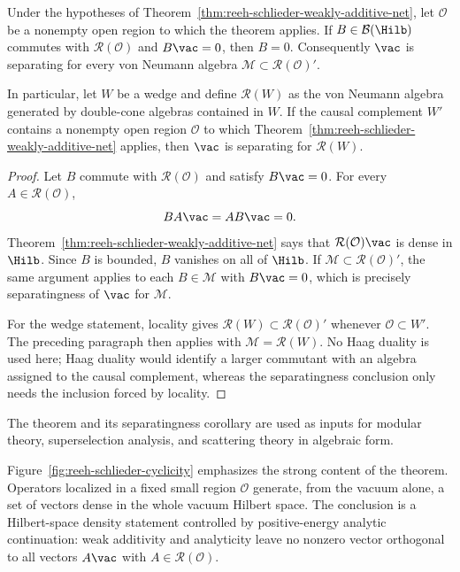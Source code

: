 \begin{corollary}
\label{cor:reeh-schlieder-separatingness}
Under the hypotheses of
Theorem~\ref{thm:reeh-schlieder-weakly-additive-net}, let
\(\mathcal O\) be a nonempty open region to which the theorem applies.
If \(B\in\mathcal B(\Hilb)\) commutes with \(\mathcal R(\mathcal O)\) and
\(B\vac=0\), then \(B=0\).  Consequently \(\vac\) is separating for every
von Neumann algebra \(\mathcal M\subset\mathcal R(\mathcal O)'\).

In particular, let \(W\) be a wedge and define \(\mathcal R(W)\) as the von
Neumann algebra generated by double-cone algebras contained in \(W\).  If the
causal complement \(W'\) contains a nonempty open region \(\mathcal O\) to
which Theorem~\ref{thm:reeh-schlieder-weakly-additive-net} applies, then
\(\vac\) is separating for \(\mathcal R(W)\).
\end{corollary}

\begin{proof}
Let \(B\) commute with \(\mathcal R(\mathcal O)\) and satisfy \(B\vac=0\).
For every \(A\in\mathcal R(\mathcal O)\),
\[
  B A\vac=A B\vac=0 .
\]
Theorem~\ref{thm:reeh-schlieder-weakly-additive-net} says that
\(\mathcal R(\mathcal O)\vac\) is dense in \(\Hilb\).  Since \(B\) is
bounded, \(B\) vanishes on all of \(\Hilb\).  If
\(\mathcal M\subset\mathcal R(\mathcal O)'\), the same argument applies to
each \(B\in\mathcal M\) with \(B\vac=0\), which is precisely separatingness
of \(\vac\) for \(\mathcal M\).

For the wedge statement, locality gives
\(\mathcal R(W)\subset\mathcal R(\mathcal O)'\) whenever
\(\mathcal O\subset W'\).  The preceding paragraph then applies with
\(\mathcal M=\mathcal R(W)\).  No Haag duality is used here; Haag duality
would identify a larger commutant with an algebra assigned to the causal
complement, whereas the separatingness conclusion only needs the inclusion
forced by locality.
\end{proof}

The theorem and its separatingness corollary are used as inputs for modular
theory, superselection analysis, and scattering theory in algebraic form.

Figure~\ref{fig:reeh-schlieder-cyclicity} emphasizes the strong content of the
theorem.  Operators localized in a fixed small region \(\mathcal O\) generate,
from the vacuum alone, a set of vectors dense in the whole vacuum Hilbert
space.  The conclusion is a Hilbert-space density statement controlled by
positive-energy analytic continuation: weak additivity and analyticity leave
no nonzero vector orthogonal to all vectors \(A\vac\) with
\(A\in\mathcal R(\mathcal O)\).

